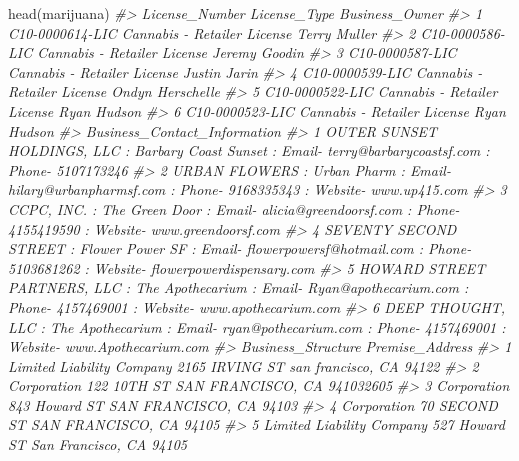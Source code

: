 \documentclass[
]{krantz}
\makeatletter
\newenvironment{Shaded}{\begin{snugshade}}{\end{snugshade}}
\newcommand{\CommentTok}[1]{\textcolor[rgb]{0.37,0.37,0.37}{\textit{#1}}}
\newcommand{\FunctionTok}[1]{\textcolor[rgb]{0,0,0}{#1}}
\newcommand{\NormalTok}[1]{#1}
\newenvironment{kframe}{%
\medskip{}
\setlength{\fboxsep}{.8em}
 \def\at@end@of@kframe{}%
 \ifinner\ifhmode%
  \def\at@end@of@kframe{\end{minipage}}%
  \begin{minipage}{\columnwidth}%
 \fi\fi%
 \def\FrameCommand##1{\hskip\@totalleftmargin \hskip-\fboxsep
 \colorbox{shadecolor}{##1}\hskip-\fboxsep
     \hskip-\linewidth \hskip-\@totalleftmargin \hskip\columnwidth}%
 \MakeFramed {\advance\hsize-\width
   \@totalleftmargin\z@ \linewidth\hsize
   \@setminipage}}%
 {\par\unskip\endMakeFramed%
 \at@end@of@kframe}
\renewenvironment{Shaded}{\begin{kframe}}{\end{kframe}}
\makeatother
\begin{document}
\begin{Shaded}
\begin{Highlighting}[]
\FunctionTok{head}\NormalTok{(marijuana)}
\CommentTok{\#\textgreater{}    License\_Number                License\_Type   Business\_Owner}
\CommentTok{\#\textgreater{} 1 C10{-}0000614{-}LIC Cannabis {-} Retailer License     Terry Muller}
\CommentTok{\#\textgreater{} 2 C10{-}0000586{-}LIC Cannabis {-} Retailer License    Jeremy Goodin}
\CommentTok{\#\textgreater{} 3 C10{-}0000587{-}LIC Cannabis {-} Retailer License     Justin Jarin}
\CommentTok{\#\textgreater{} 4 C10{-}0000539{-}LIC Cannabis {-} Retailer License Ondyn Herschelle}
\CommentTok{\#\textgreater{} 5 C10{-}0000522{-}LIC Cannabis {-} Retailer License      Ryan Hudson}
\CommentTok{\#\textgreater{} 6 C10{-}0000523{-}LIC Cannabis {-} Retailer License      Ryan Hudson}
\CommentTok{\#\textgreater{}                                                                                                           Business\_Contact\_Information}
\CommentTok{\#\textgreater{} 1                             OUTER SUNSET HOLDINGS, LLC  : Barbary Coast Sunset : Email{-} terry@barbarycoastsf.com : Phone{-} 5107173246}
\CommentTok{\#\textgreater{} 2                           URBAN FLOWERS  : Urban Pharm : Email{-} hilary@urbanpharmsf.com : Phone{-} 9168335343 : Website{-} www.up415.com}
\CommentTok{\#\textgreater{} 3                      CCPC, INC.  : The Green Door : Email{-} alicia@greendoorsf.com : Phone{-} 4155419590 : Website{-} www.greendoorsf.com}
\CommentTok{\#\textgreater{} 4 SEVENTY SECOND STREET  : Flower Power SF : Email{-} flowerpowersf@hotmail.com : Phone{-} 5103681262 : Website{-} flowerpowerdispensary.com}
\CommentTok{\#\textgreater{} 5   HOWARD STREET PARTNERS, LLC  : The Apothecarium : Email{-} Ryan@apothecarium.com : Phone{-} 4157469001 : Website{-} www.apothecarium.com}
\CommentTok{\#\textgreater{} 6              DEEP THOUGHT, LLC  : The Apothecarium : Email{-} ryan@pothecarium.com : Phone{-} 4157469001 : Website{-} www.Apothecarium.com}
\CommentTok{\#\textgreater{}          Business\_Structure                         Premise\_Address}
\CommentTok{\#\textgreater{} 1 Limited Liability Company  2165 IRVING ST san francisco, CA 94122}
\CommentTok{\#\textgreater{} 2               Corporation 122 10TH ST SAN FRANCISCO, CA 941032605}
\CommentTok{\#\textgreater{} 3               Corporation   843 Howard ST SAN FRANCISCO, CA 94103}
\CommentTok{\#\textgreater{} 4               Corporation    70 SECOND ST SAN FRANCISCO, CA 94105}
\CommentTok{\#\textgreater{} 5 Limited Liability Company   527 Howard ST San Francisco, CA 94105}

\end{Highlighting}
\end{Shaded}
\end{document}
